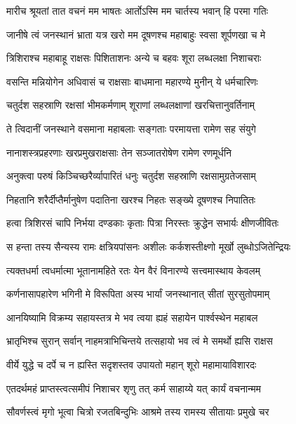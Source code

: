 
\twolineshloka
{मारीच श्रूयतां तात वचनं मम भाषतः}
{आर्तोऽस्मि मम चार्तस्य भवान् हि परमा गतिः} %

\twolineshloka
{जानीषे त्वं जनस्थानं भ्राता यत्र खरो मम}
{दूषणश्च महाबाहुः स्वसा शूर्पणखा च मे} %

\twolineshloka
{त्रिशिराश्च महाबाहू राक्षसः पिशिताशनः}
{अन्ये च बहवः शूरा लब्धलक्षा निशाचराः} %

\twolineshloka
{वसन्ति मन्नियोगेन अधिवासं च राक्षसाः}
{बाधमाना महारण्ये मुनीन् ये धर्मचारिणः} %

\twolineshloka
{चतुर्दश सहस्राणि रक्षसां भीमकर्मणाम्}
{शूराणां लब्धलक्षाणां खरचित्तानुवर्तिनाम्} %

\twolineshloka
{ते त्विदानीं जनस्थाने वसमाना महाबलाः}
{सङ्गताः परमायत्ता रामेण सह संयुगे} %

\twolineshloka
{नानाशस्त्रप्रहरणाः खरप्रमुखराक्षसाः}
{तेन सञ्जातरोषेण रामेण रणमूर्धनि} %

\twolineshloka
{अनुक्त्वा परुषं किञ्चिच्छरैर्व्यापारितं धनुः}
{चतुर्दश सहस्राणि रक्षसामुग्रतेजसाम्} %

\twolineshloka
{निहतानि शरैर्दीप्तैर्मानुषेण पदातिना}
{खरश्च निहतः सङ्ख्ये दूषणश्च निपातितः} %

\twolineshloka
{हत्वा त्रिशिरसं चापि निर्भया दण्डकाः कृताः}
{पित्रा निरस्तः क्रुद्धेन सभार्यः क्षीणजीवितः} %

\twolineshloka
{स हन्ता तस्य सैन्यस्य रामः क्षत्रियपांसनः}
{अशीलः कर्कशस्तीक्ष्णो मूर्खो लुब्धोऽजितेन्द्रियः} %

\twolineshloka
{त्यक्तधर्मा त्वधर्मात्मा भूतानामहिते रतः}
{येन वैरं विनारण्ये सत्त्वमास्थाय केवलम्} %

\twolineshloka
{कर्णनासापहारेण भगिनी मे विरूपिता}
{अस्य भार्यां जनस्थानात् सीतां सुरसुतोपमाम्} %

\twolineshloka
{आनयिष्यामि विक्रम्य सहायस्तत्र मे भव}
{त्वया ह्यहं सहायेन पार्श्वस्थेन महाबल} %

\twolineshloka
{भ्रातृभिश्च सुरान् सर्वान् नाहमत्राभिचिन्तये}
{तत्सहायो भव त्वं मे समर्थो ह्यसि राक्षस} %

\twolineshloka
{वीर्ये युद्धे च दर्पे च न ह्यस्ति सदृशस्तव}
{उपायतो महान् शूरो महामायाविशारदः} %

\twolineshloka
{एतदर्थमहं प्राप्तस्त्वत्समीपं निशाचर}
{शृणु तत् कर्म साहाय्ये यत् कार्यं वचनान्मम} %

\twolineshloka
{सौवर्णस्त्वं मृगो भूत्वा चित्रो रजतबिन्दुभिः}
{आश्रमे तस्य रामस्य सीतायाः प्रमुखे चर} %

